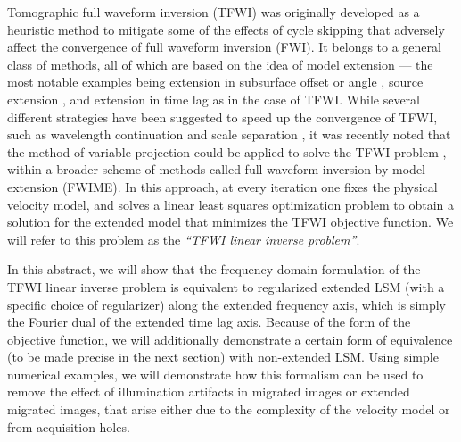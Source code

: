 Tomographic full waveform inversion (TFWI) \citep{biondi2012tomographic, biondi2013tomographic, TFWI.gp} was originally developed as a heuristic method to mitigate some of the effects of cycle skipping that adversely affect the convergence of full waveform inversion (FWI). It belongs to a general class of methods, all of which are based on the idea of model extension --- the most notable examples being extension in subsurface offset or angle \citep{sava2003angle, rickett2002offset}, source extension \citep{huang2015full, huang2016matched}, and extension in time lag as in the case of TFWI. While several different strategies have been suggested to speed up the convergence of TFWI, such as wavelength continuation and scale separation \citep{almomin2012tomographic, almomin2013tomographic}, it was recently noted that the method of variable projection could be applied to solve the TFWI problem \citep{barnier2018full}, within a broader scheme of methods called full waveform inversion by model extension (FWIME). In this approach, at every iteration one fixes the physical velocity model, and solves a linear least squares optimization problem to obtain a solution for the extended model that minimizes the TFWI objective function. We will refer to this problem as the \textit{``TFWI linear inverse problem''}.

In this abstract, we will show that the frequency domain formulation of the TFWI linear inverse problem is equivalent to regularized extended LSM (with a specific choice of regularizer) along the extended frequency axis, which is simply the Fourier dual of the extended time lag axis. Because of the form of the objective function, we will additionally demonstrate a certain form of equivalence (to be made precise in the next section) with non-extended LSM. Using simple numerical examples, we will demonstrate how this formalism can be used to remove the effect of illumination artifacts in migrated images or extended migrated images, that arise either due to the complexity of the velocity model or from acquisition holes.